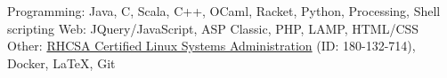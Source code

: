 \begin{cvskills}
    \cvskill
    {Programming:}
    {Java, C, Scala, C++, OCaml, Racket, Python, Processing, Shell scripting}
	\cvskill
	{Web:}
	{JQuery/JavaScript, ASP Classic, PHP, LAMP, HTML/CSS}
	\cvskill
	{Other:}
	{\href{https://www.redhat.com/rhtapps/services/verify/?certId=180-132-714}{RHCSA Certified Linux Systems Administration} (ID: 180-132-714), Docker, LaTeX, Git}
	\vspace{-1.5em} %
\end{cvskills}
